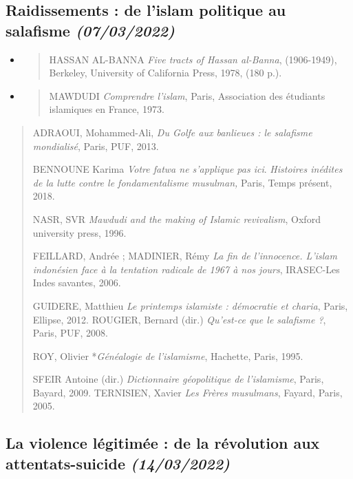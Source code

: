 \hypertarget{raidissements-de-lislam-politique-au-salafisme-07032022}{%
\subsection{\texorpdfstring{{Raidissements : de l'islam
politique au salafisme}
\emph{(07/03/2022)}}{Raidissements : de l'islam politique au salafisme (07/03/2022)}}\label{raidissements-de-lislam-politique-au-salafisme-07032022}}

\begin{itemize}
\item
  \begin{quote}
  HASSAN AL-BANNA \emph{Five tracts of Hassan al-Banna}, (1906-1949),
  Berkeley, University of California Press, 1978, (180 p.).
  \end{quote}
\item
  \begin{quote}
  MAWDUDI \emph{Comprendre l'islam}, Paris, Association des étudiants
  islamiques en France, 1973.
  \end{quote}
\end{itemize}

\begin{quote}
ADRAOUI, Mohammed-Ali, \emph{Du Golfe aux banlieues : le salafisme
mondialisé}, Paris, PUF, 2013.

BENNOUNE Karima \emph{Votre fatwa ne s'applique pas ici}.
\emph{Histoires inédites de la lutte contre le fondamentalisme
musulman,} Paris, Temps présent, 2018.

NASR, SVR \emph{Mawdudi and the making of Islamic revivalism}, Oxford
university press, 1996.

FEILLARD, Andrée ; MADINIER, Rémy \emph{La fin de l'innocence. L'islam
indonésien face à la tentation radicale de 1967 à nos jours}, IRASEC-Les
Indes savantes, 2006.

GUIDERE, Matthieu \emph{Le printemps islamiste : démocratie et charia},
Paris, Ellipse, 2012. ROUGIER, Bernard (dir.) \emph{Qu'est-ce que le
salafisme ?}, Paris, PUF, 2008.

ROY, Olivier *\emph{Généalogie de l'islamisme}, Hachette, Paris, 1995.

SFEIR Antoine (dir.) \emph{Dictionnaire géopolitique de l'islamisme},
Paris, Bayard, 2009. TERNISIEN, Xavier \emph{Les Frères musulmans},
Fayard, Paris, 2005.
\end{quote}

\hypertarget{la-violence-luxe9gitimuxe9e-de-la-ruxe9volution-aux-attentats-suicide-14032022}{%
\subsection{\texorpdfstring{{La violence légitimée : de la
révolution aux attentats-suicide}
\emph{(14/03/2022)}}{La violence légitimée : de la révolution aux attentats-suicide (14/03/2022)}}\label{la-violence-luxe9gitimuxe9e-de-la-ruxe9volution-aux-attentats-suicide-14032022}}

